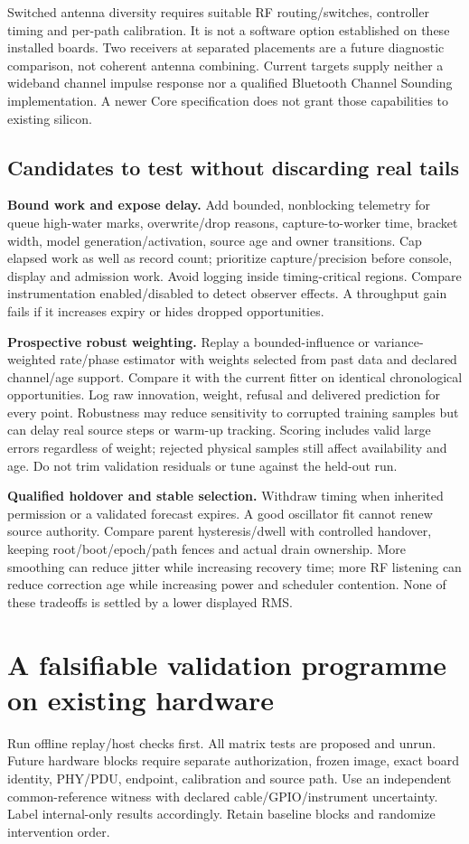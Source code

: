 \documentclass[11pt,letterpaper]{article}
\begin{document}
Switched antenna diversity requires suitable RF routing/switches, controller timing and per-path calibration. It is not a software option established on these installed boards. Two receivers at separated placements are a future diagnostic comparison, not coherent antenna combining. Current targets supply neither a wideband channel impulse response nor a qualified Bluetooth Channel Sounding implementation. A newer Core specification does not grant those capabilities to existing silicon.

\subsection{Candidates to test without discarding real tails}
\textbf{Bound work and expose delay.} Add bounded, nonblocking telemetry for queue high-water marks, overwrite/drop reasons, capture-to-worker time, bracket width, model generation/activation, source age and owner transitions. Cap elapsed work as well as record count; prioritize capture/precision before console, display and admission work. Avoid logging inside timing-critical regions. Compare instrumentation enabled/disabled to detect observer effects. A throughput gain fails if it increases expiry or hides dropped opportunities.

\textbf{Prospective robust weighting.} Replay a bounded-influence or variance-weighted rate/phase estimator with weights selected from past data and declared channel/age support. Compare it with the current fitter on identical chronological opportunities. Log raw innovation, weight, refusal and delivered prediction for every point. Robustness may reduce sensitivity to corrupted training samples but can delay real source steps or warm-up tracking. Scoring includes valid large errors regardless of weight; rejected physical samples still affect availability and age. Do not trim validation residuals or tune against the held-out run.

\textbf{Qualified holdover and stable selection.} Withdraw timing when inherited permission or a validated forecast expires. A good oscillator fit cannot renew source authority. Compare parent hysteresis/dwell with controlled handover, keeping root/boot/epoch/path fences and actual drain ownership. More smoothing can reduce jitter while increasing recovery time; more RF listening can reduce correction age while increasing power and scheduler contention. None of these tradeoffs is settled by a lower displayed RMS.
\newpage
\section{A falsifiable validation programme on existing hardware}
Run offline replay/host checks first. All matrix tests are proposed and unrun. Future hardware blocks require separate authorization, frozen image, exact board identity, PHY/PDU, endpoint, calibration and source path. Use an independent common-reference witness with declared cable/GPIO/instrument uncertainty. Label internal-only results accordingly. Retain baseline blocks and randomize intervention order.
\end{document}

